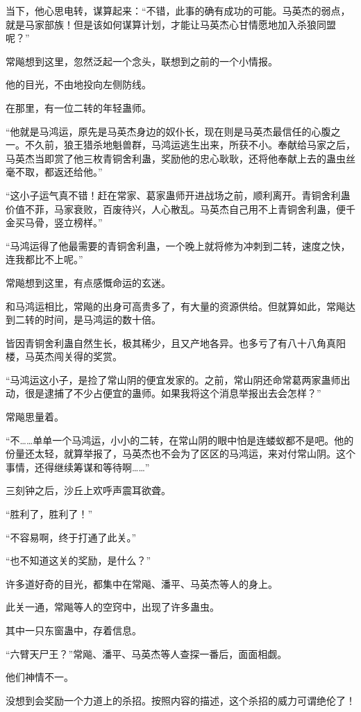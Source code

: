 \begin{this_body}
当下，他心思电转，谋算起来：“不错，此事的确有成功的可能。马英杰的弱点，就是马家部族！但是该如何谋算计划，才能让马英杰心甘情愿地加入杀狼同盟呢？”

常飚想到这里，忽然泛起一个念头，联想到之前的一个小情报。

他的目光，不由地投向左侧防线。

在那里，有一位二转的年轻蛊师。

“他就是马鸿运，原先是马英杰身边的奴仆长，现在则是马英杰最信任的心腹之一。不久前，狼王猎杀地魁兽群，马鸿运逃生出来，所获不小。奉献给马家之后，马英杰当即赏了他三枚青铜舍利蛊，奖励他的忠心耿耿，还将他奉献上去的蛊虫丝毫不取，都返还给他。”

“这小子运气真不错！赶在常家、葛家蛊师开进战场之前，顺利离开。青铜舍利蛊价值不菲，马家衰败，百废待兴，人心散乱。马英杰自己用不上青铜舍利蛊，便千金买马骨，竖立榜样。”

“马鸿运得了他最需要的青铜舍利蛊，一个晚上就将修为冲刺到二转，速度之快，连我都比不上呢。”

常飚想到这里，有点感慨命运的玄迷。

和马鸿运相比，常飚的出身可高贵多了，有大量的资源供给。但就算如此，常飚达到二转的时间，是马鸿运的数十倍。

皆因青铜舍利蛊自然生长，极其稀少，且又产地各异。也多亏了有八十八角真阳楼，马英杰闯关得的奖赏。

“马鸿运这小子，是捡了常山阴的便宜发家的。之前，常山阴还命常葛两家蛊师出动，很是逮捕了不少占便宜的蛊师。如果我将这个消息举报出去会怎样？”

常飚思量着。

“不……单单一个马鸿运，小小的二转，在常山阴的眼中怕是连蝼蚁都不是吧。他的份量还太轻，就算举报了，马英杰也不会为了区区的马鸿运，来对付常山阴。这个事情，还得继续筹谋和等待啊……”

三刻钟之后，沙丘上欢呼声震耳欲聋。

“胜利了，胜利了！”

“不容易啊，终于打通了此关。”

“也不知道这关的奖励，是什么？”

许多道好奇的目光，都集中在常飚、潘平、马英杰等人的身上。

此关一通，常飚等人的空窍中，出现了许多蛊虫。

其中一只东窗蛊中，存着信息。

“六臂天尸王？”常飚、潘平、马英杰等人查探一番后，面面相觑。

他们神情不一。

没想到会奖励一个力道上的杀招。按照内容的描述，这个杀招的威力可谓绝伦了！

\end{this_body}

